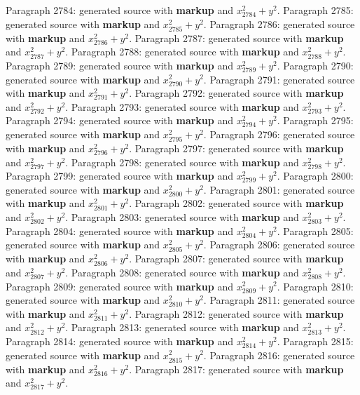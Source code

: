 \documentclass{article}
\begin{document}
Paragraph 2784: generated source with \textbf{markup} and $x_{2784}^2 + y^2$.
Paragraph 2785: generated source with \textbf{markup} and $x_{2785}^2 + y^2$.
Paragraph 2786: generated source with \textbf{markup} and $x_{2786}^2 + y^2$.
Paragraph 2787: generated source with \textbf{markup} and $x_{2787}^2 + y^2$.
Paragraph 2788: generated source with \textbf{markup} and $x_{2788}^2 + y^2$.
Paragraph 2789: generated source with \textbf{markup} and $x_{2789}^2 + y^2$.
Paragraph 2790: generated source with \textbf{markup} and $x_{2790}^2 + y^2$.
Paragraph 2791: generated source with \textbf{markup} and $x_{2791}^2 + y^2$.
Paragraph 2792: generated source with \textbf{markup} and $x_{2792}^2 + y^2$.
Paragraph 2793: generated source with \textbf{markup} and $x_{2793}^2 + y^2$.
Paragraph 2794: generated source with \textbf{markup} and $x_{2794}^2 + y^2$.
Paragraph 2795: generated source with \textbf{markup} and $x_{2795}^2 + y^2$.
Paragraph 2796: generated source with \textbf{markup} and $x_{2796}^2 + y^2$.
Paragraph 2797: generated source with \textbf{markup} and $x_{2797}^2 + y^2$.
Paragraph 2798: generated source with \textbf{markup} and $x_{2798}^2 + y^2$.
Paragraph 2799: generated source with \textbf{markup} and $x_{2799}^2 + y^2$.
Paragraph 2800: generated source with \textbf{markup} and $x_{2800}^2 + y^2$.
Paragraph 2801: generated source with \textbf{markup} and $x_{2801}^2 + y^2$.
Paragraph 2802: generated source with \textbf{markup} and $x_{2802}^2 + y^2$.
Paragraph 2803: generated source with \textbf{markup} and $x_{2803}^2 + y^2$.
Paragraph 2804: generated source with \textbf{markup} and $x_{2804}^2 + y^2$.
Paragraph 2805: generated source with \textbf{markup} and $x_{2805}^2 + y^2$.
Paragraph 2806: generated source with \textbf{markup} and $x_{2806}^2 + y^2$.
Paragraph 2807: generated source with \textbf{markup} and $x_{2807}^2 + y^2$.
Paragraph 2808: generated source with \textbf{markup} and $x_{2808}^2 + y^2$.
Paragraph 2809: generated source with \textbf{markup} and $x_{2809}^2 + y^2$.
Paragraph 2810: generated source with \textbf{markup} and $x_{2810}^2 + y^2$.
Paragraph 2811: generated source with \textbf{markup} and $x_{2811}^2 + y^2$.
Paragraph 2812: generated source with \textbf{markup} and $x_{2812}^2 + y^2$.
Paragraph 2813: generated source with \textbf{markup} and $x_{2813}^2 + y^2$.
Paragraph 2814: generated source with \textbf{markup} and $x_{2814}^2 + y^2$.
Paragraph 2815: generated source with \textbf{markup} and $x_{2815}^2 + y^2$.
Paragraph 2816: generated source with \textbf{markup} and $x_{2816}^2 + y^2$.
Paragraph 2817: generated source with \textbf{markup} and $x_{2817}^2 + y^2$.
\end{document}
